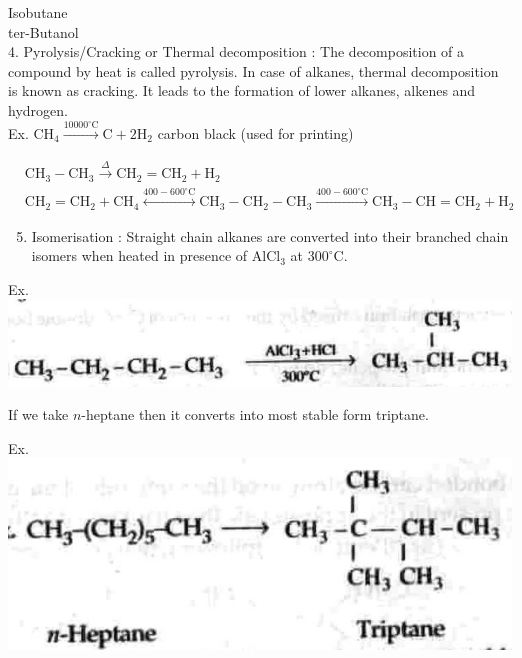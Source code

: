 \documentclass[10pt]{article}
\begin{document}
Isobutane\\
ter-Butanol\\
4. Pyrolysis/Cracking or Thermal decomposition : The decomposition of a compound by heat is called pyrolysis. In case of alkanes, thermal decomposition is known as cracking. It leads to the formation of lower alkanes, alkenes and hydrogen.\\
Ex. $\mathrm{CH}_{4} \xrightarrow{10000^{\circ} \mathrm{C}} \mathrm{C}+2 \mathrm{H}_{2}$ carbon black (used for printing)

$$
\begin{aligned}
& \mathrm{CH}_{3}-\mathrm{CH}_{3} \xrightarrow{\Delta} \mathrm{CH}_{2}=\mathrm{CH}_{2}+\mathrm{H}_{2} \\
& \mathrm{CH}_{2}=\mathrm{CH}_{2}+\mathrm{CH}_{4} \stackrel{400-600^{\circ} \mathrm{C}}{\longleftrightarrow} \mathrm{CH}_{3}-\mathrm{CH}_{2}-\mathrm{CH}_{3} \xrightarrow{400-600^{\circ} \mathrm{C}} \mathrm{CH}_{3}-\mathrm{CH}=\mathrm{CH}_{2}+\mathrm{H}_{2}
\end{aligned}
$$

\begin{enumerate}
  \setcounter{enumi}{4}
  \item Isomerisation : Straight chain alkanes are converted into their branched chain isomers when heated in presence of $\mathrm{AlCl}_{3}$ at $300^{\circ} \mathrm{C}$.
\end{enumerate}

Ex.\\
\includegraphics[max width=\textwidth, center]{2025_01_28_8470952b98110cec3aabg-175(4)}

If we take $n$-heptane then it converts into most stable form triptane.

Ex.\\
\includegraphics[max width=\textwidth, center]{2025_01_28_8470952b98110cec3aabg-175(1)}
\end{document}
